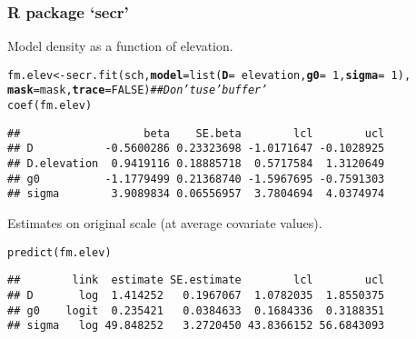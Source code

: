\documentclass[color=usenames,dvipsnames]{beamer}\usepackage[]{graphicx}\usepackage[]{xcolor}
\makeatletter
\newcommand{\hlnum}[1]{\textcolor[rgb]{0.69,0.494,0}{#1}}%
\newcommand{\hlcom}[1]{\textcolor[rgb]{0.514,0.506,0.514}{\textit{#1}}}%
\newcommand{\hlopt}[1]{\textcolor[rgb]{0,0,0}{#1}}%
\newcommand{\hlstd}[1]{\textcolor[rgb]{0,0,0}{#1}}%
\newcommand{\hlkwb}[1]{\textcolor[rgb]{0,0.341,0.682}{#1}}%
\newcommand{\hlkwc}[1]{\textcolor[rgb]{0,0,0}{\textbf{#1}}}%
\newcommand{\hlkwd}[1]{\textcolor[rgb]{0.004,0.004,0.506}{#1}}%
\newenvironment{kframe}{%
 \def\at@end@of@kframe{}%
 \ifinner\ifhmode%
  \def\at@end@of@kframe{\end{minipage}}%
  \begin{minipage}{\columnwidth}%
 \fi\fi%
 \def\FrameCommand##1{\hskip\@totalleftmargin \hskip-\fboxsep
 \colorbox{shadecolor}{##1}\hskip-\fboxsep
     \hskip-\linewidth \hskip-\@totalleftmargin \hskip\columnwidth}%
 \MakeFramed {\advance\hsize-\width
   \@totalleftmargin\z@ \linewidth\hsize
   \@setminipage}}%
 {\par\unskip\endMakeFramed%
 \at@end@of@kframe}
\newenvironment{knitrout}{}{} %
\makeatother
\begin{document}
\begin{frame}[fragile]
  \frametitle{R package `secr'}
  Model density as a function of elevation. 
\begin{knitrout}\scriptsize
{}\color{fgcolor}\begin{kframe}
\begin{alltt}
\hlstd{fm.elev} \hlkwb{<-} \hlkwd{secr.fit}\hlstd{(sch,} \hlkwc{model}\hlstd{=}\hlkwd{list}\hlstd{(}\hlkwc{D}\hlstd{=}\hlopt{~}\hlstd{elevation,} \hlkwc{g0}\hlstd{=}\hlopt{~}\hlnum{1}\hlstd{,} \hlkwc{sigma}\hlstd{=}\hlopt{~}\hlnum{1}\hlstd{),}
                    \hlkwc{mask}\hlstd{=mask,} \hlkwc{trace}\hlstd{=}\hlnum{FALSE}\hlstd{)}  \hlcom{## Don't use 'buffer'}
\hlkwd{coef}\hlstd{(fm.elev)}
\end{alltt}
\begin{verbatim}
##                   beta    SE.beta        lcl        ucl
## D           -0.5600286 0.23323698 -1.0171647 -0.1028925
## D.elevation  0.9419116 0.18885718  0.5717584  1.3120649
## g0          -1.1779499 0.21368740 -1.5967695 -0.7591303
## sigma        3.9089834 0.06556957  3.7804694  4.0374974
\end{verbatim}
\end{kframe}
\end{knitrout}
\pause
\vfill
Estimates on original scale (at average covariate values).
\begin{knitrout}\scriptsize
{}\color{fgcolor}\begin{kframe}
\begin{alltt}
\hlkwd{predict}\hlstd{(fm.elev)}
\end{alltt}
\begin{verbatim}
##        link  estimate SE.estimate        lcl        ucl
## D       log  1.414252   0.1967067  1.0782035  1.8550375
## g0    logit  0.235421   0.0384633  0.1684336  0.3188351
## sigma   log 49.848252   3.2720450 43.8366152 56.6843093
\end{verbatim}
\end{kframe}
\end{knitrout}
\end{frame}
\end{document}
